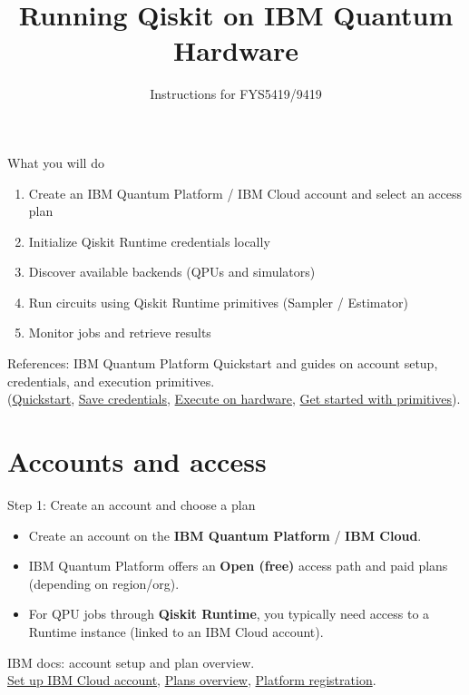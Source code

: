 \documentclass{beamer}
\title{Running Qiskit on IBM Quantum Hardware}
\author{Instructions for FYS5419/9419}
\date{}
\begin{document}
\begin{frame}
\titlepage
\end{frame}

\begin{frame}{What you will do}
\begin{enumerate}
  \item Create an IBM Quantum Platform / IBM Cloud account and select an access plan
  \item Initialize Qiskit Runtime credentials locally
  \item Discover available backends (QPUs and simulators)
  \item Run circuits using Qiskit Runtime primitives (Sampler / Estimator)
  \item Monitor jobs and retrieve results
\end{enumerate}

\vspace{0.4em}
\scriptsize
References: IBM Quantum Platform Quickstart and guides on account setup, credentials, and execution primitives. \\
(\href{https://quantum.cloud.ibm.com/docs/guides/quick-start}{Quickstart},
\href{https://quantum.cloud.ibm.com/docs/guides/save-credentials}{Save credentials},
\href{https://quantum.cloud.ibm.com/docs/guides/execute-on-hardware}{Execute on hardware},
\href{https://quantum.cloud.ibm.com/docs/guides/get-started-with-primitives}{Get started with primitives}).%
\end{frame}

\section{Accounts and access}

\begin{frame}{Step 1: Create an account and choose a plan}
\begin{itemize}
  \item Create an account on the \textbf{IBM Quantum Platform} / \textbf{IBM Cloud}.
  \item IBM Quantum Platform offers an \textbf{Open (free)} access path and paid plans (depending on region/org).%
  \item For QPU jobs through \textbf{Qiskit Runtime}, you typically need access to a Runtime instance (linked to an IBM Cloud account).
\end{itemize}

\vspace{0.4em}
\scriptsize
IBM docs: account setup and plan overview.\\
\href{https://quantum.cloud.ibm.com/docs/guides/cloud-setup}{Set up IBM Cloud account},
\href{https://quantum.cloud.ibm.com/docs/guides/plans-overview}{Plans overview},
\href{https://quantum.cloud.ibm.com/registration}{Platform registration}.%
\end{frame}
\end{document}
